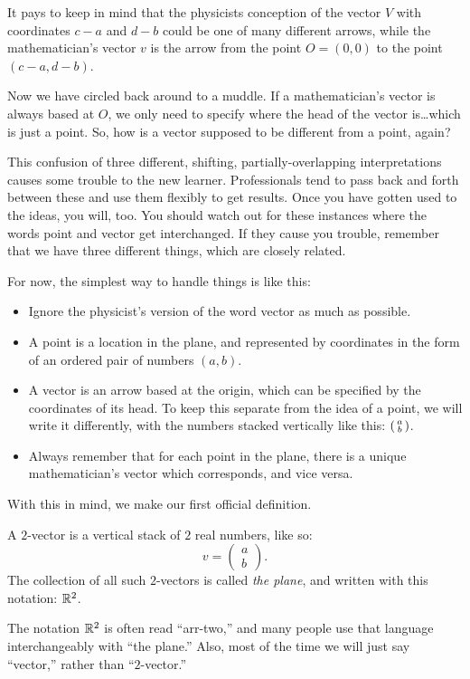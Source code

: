 \documentclass[elementsmain.tex]{subfiles}
\begin{document}
It pays to keep in mind that the physicists conception of the vector $V$ with coordinates $c-a$ and $d-b$ could be one of many different arrows, while the mathematician's vector $v$ is the arrow from the point $O = (0,0)$ to the point $(c-a, d-b)$.

Now we have circled back around to a muddle. If a mathematician's vector is always based at $O$, we only need to specify where the head of the vector is\dots which is just a point. So, how is a vector supposed to be different from a point, again?

This confusion of three different, shifting, partially-overlapping interpretations causes some trouble to the new learner.
Professionals tend to pass back and forth between these and use them flexibly to get results.
Once you have gotten used to the ideas, you will, too.
You should watch out for these instances where the words point and vector get interchanged.
If they cause you trouble, remember that we have three different things, which are closely related.

For now, the simplest way to handle things is like this:
\begin{itemize}
\item Ignore the physicist's version of the word vector as much as possible.
\item A point is a location in the plane, and represented by coordinates in the form of an ordered pair of numbers $(a,b)$.
\item A vector is an arrow based at the origin, which can be specified by the coordinates of its head. To keep this separate from the idea of a point, we will write it differently, with the numbers stacked vertically like this: $\left(\begin{smallmatrix} a \\ b \end{smallmatrix}\right)$.
\item Always remember that for each point in the plane, there is a unique mathematician's vector which corresponds, and vice versa.
\end{itemize}
With this in mind, we make our first official definition.

\begin{definition} A $2$-vector is a vertical stack of $2$ real numbers, like so:
\[
v = \begin{pmatrix} a \\ b \end{pmatrix}.
\]
The collection of all such $2$-vectors is called \emph{the plane}, and written with this notation: $\mathbb{R}^2$.
\end{definition}

The notation $\mathbb{R}^2$ is often read ``arr-two,'' and many people use that language interchangeably with ``the plane.'' Also, most of the time we will just say ``vector,'' rather than ``$2$-vector.'' 
\end{document}
